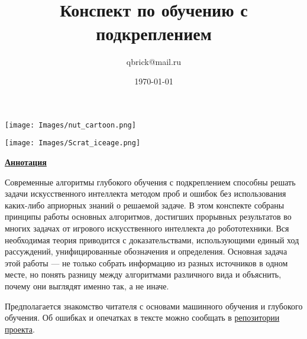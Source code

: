 \documentclass[a5paper, 10pt, oneside]{memoir}
\title{
\vspace{4cm}
\normalfont \normalsize 
\horrule{0.5pt} \\[0.4cm]
\huge Конспект по обучению с подкреплением
\horrule{2pt} \\[0.5cm]
}
\author{qbrick@mail.ru}
\date{\normalsize\today}
\begin{document}

\maketitle
\thispagestyle{empty}

\vspace{-6.3cm}
\begin{adjustwidth}{0.5cm}{}
    \texttt{[image: Images/nut\_cartoon.png]}
\end{adjustwidth}
\vspace{4cm}
\begin{center}
    \texttt{[image: Images/Scrat\_iceage.png]}
\end{center}

\vspace{2.2cm}
\begin{center}
\textcolor{ChadBlue}{\underline{\textbf{Аннотация}}}
\end{center}

\vspace{0.5cm}
Современные алгоритмы глубокого обучения с подкреплением способны решать задачи искусственного интеллекта методом проб и ошибок без использования каких-либо априорных знаний о решаемой задаче. В этом конспекте собраны принципы работы основных алгоритмов, достигших прорывных результатов во многих задачах от игрового искусственного интеллекта до робототехники. Вся необходимая теория приводится с доказательствами, использующими единый ход рассуждений, унифицированные обозначения и определения. Основная задача этой работы --- не только собрать информацию из разных источников в одном месте, но понять разницу между алгоритмами различного вида и объяснить, почему они выглядят именно так, а не иначе.

\vspace{0.3cm}
Предполагается знакомство читателя с основами машинного обучения и глубокого обучения. Об ошибках и опечатках в тексте можно сообщать в \href{https://github.com/FortsAndMills/RL-Theory-book}{репозитории проекта}.

\end{document}
